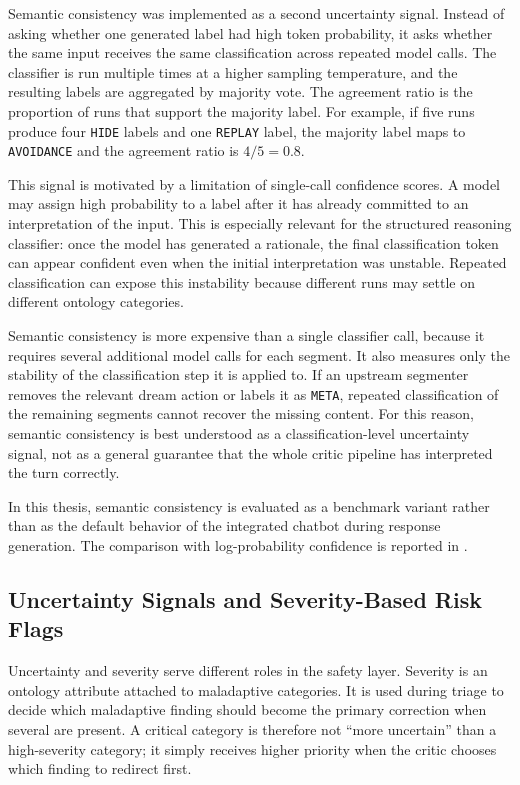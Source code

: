 Semantic consistency was implemented as a second uncertainty signal. Instead of
asking whether one generated label had high token probability, it asks whether the same
input receives the same classification across repeated model calls. The classifier is run
multiple times at a higher sampling temperature, and the resulting labels are aggregated
by majority vote. The agreement ratio is the proportion of runs that support the
majority label. For example, if five runs produce four \texttt{HIDE} labels and one
\texttt{REPLAY} label, the majority label maps to \texttt{AVOIDANCE} and the agreement
ratio is \(4/5 = 0.8\).

This signal is motivated by a limitation of single-call confidence scores. A model may
assign high probability to a label after it has already committed to an interpretation of
the input. This is especially relevant for the structured reasoning classifier: once the
model has generated a rationale, the final classification token can appear confident even
when the initial interpretation was unstable. Repeated classification can expose this
instability because different runs may settle on different ontology categories.

Semantic consistency is more expensive than a single classifier call, because it requires
several additional model calls for each segment. It also measures only the stability of
the classification step it is applied to. If an upstream segmenter removes the relevant
dream action or labels it as \texttt{META}, repeated classification of the remaining
segments cannot recover the missing content. For this reason, semantic consistency is
best understood as a classification-level uncertainty signal, not as a general guarantee
that the whole critic pipeline has interpreted the turn correctly.

In this thesis, semantic consistency is evaluated as a benchmark variant rather than as
the default behavior of the integrated chatbot during response generation. The comparison
with log-probability confidence is reported in .

\subsection{Uncertainty Signals and Severity-Based Risk Flags}

Uncertainty and severity serve different roles in the safety layer. Severity is an
ontology attribute attached to maladaptive categories. It is used during triage to decide
which maladaptive finding should become the primary correction when several are
present. A critical category is therefore not ``more uncertain'' than a high-severity
category; it simply receives higher priority when the critic chooses which finding to
redirect first.

